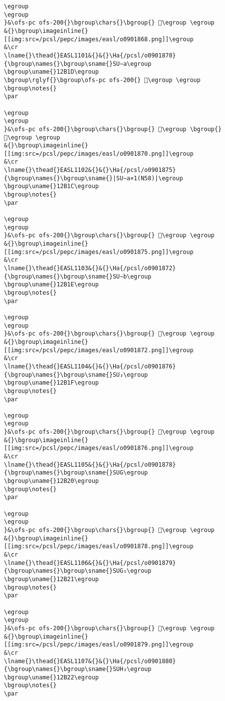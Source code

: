 \begin{verbatim}
\egroup
\egroup
}&\ofs-pc ofs-200{}\bgroup\chars{}\bgroup{} 𒬚\egroup \egroup
&{}\bgroup\imageinline{}[[img:src=/pcsl/pepc/images/easl/o0901868.png]]\egroup
&\cr
\lname{}\thead{}EASL1101&{}&{}\Ha{/pcsl/o0901870}{\bgroup\names{}\bgroup\sname{}SU∼a\egroup
\bgroup\uname{}12B1D\egroup
\bgroup\rglyf{}\bgroup\ofs-pc ofs-200{} 𒬝\egroup \egroup
\bgroup\notes{}
\par 

\egroup
\egroup
}&\ofs-pc ofs-200{}\bgroup\chars{}\bgroup{} 𒬛\egroup \bgroup{} 𒬝\egroup \egroup
&{}\bgroup\imageinline{}[[img:src=/pcsl/pepc/images/easl/o0901870.png]]\egroup
&\cr
\lname{}\thead{}EASL1102&{}&{}\Ha{/pcsl/o0901875}{\bgroup\names{}\bgroup\sname{}|SU∼a×1(N58)|\egroup
\bgroup\uname{}12B1C\egroup
\bgroup\notes{}
\par 

\egroup
\egroup
}&\ofs-pc ofs-200{}\bgroup\chars{}\bgroup{} 𒬜\egroup \egroup
&{}\bgroup\imageinline{}[[img:src=/pcsl/pepc/images/easl/o0901875.png]]\egroup
&\cr
\lname{}\thead{}EASL1103&{}&{}\Ha{/pcsl/o0901872}{\bgroup\names{}\bgroup\sname{}SU∼b\egroup
\bgroup\uname{}12B1E\egroup
\bgroup\notes{}
\par 

\egroup
\egroup
}&\ofs-pc ofs-200{}\bgroup\chars{}\bgroup{} 𒬞\egroup \egroup
&{}\bgroup\imageinline{}[[img:src=/pcsl/pepc/images/easl/o0901872.png]]\egroup
&\cr
\lname{}\thead{}EASL1104&{}&{}\Ha{/pcsl/o0901876}{\bgroup\names{}\bgroup\sname{}SU₃\egroup
\bgroup\uname{}12B1F\egroup
\bgroup\notes{}
\par 

\egroup
\egroup
}&\ofs-pc ofs-200{}\bgroup\chars{}\bgroup{} 𒬟\egroup \egroup
&{}\bgroup\imageinline{}[[img:src=/pcsl/pepc/images/easl/o0901876.png]]\egroup
&\cr
\lname{}\thead{}EASL1105&{}&{}\Ha{/pcsl/o0901878}{\bgroup\names{}\bgroup\sname{}SUG\egroup
\bgroup\uname{}12B20\egroup
\bgroup\notes{}
\par 

\egroup
\egroup
}&\ofs-pc ofs-200{}\bgroup\chars{}\bgroup{} 𒬠\egroup \egroup
&{}\bgroup\imageinline{}[[img:src=/pcsl/pepc/images/easl/o0901878.png]]\egroup
&\cr
\lname{}\thead{}EASL1106&{}&{}\Ha{/pcsl/o0901879}{\bgroup\names{}\bgroup\sname{}SUG₅\egroup
\bgroup\uname{}12B21\egroup
\bgroup\notes{}
\par 

\egroup
\egroup
}&\ofs-pc ofs-200{}\bgroup\chars{}\bgroup{} 𒬡\egroup \egroup
&{}\bgroup\imageinline{}[[img:src=/pcsl/pepc/images/easl/o0901879.png]]\egroup
&\cr
\lname{}\thead{}EASL1107&{}&{}\Ha{/pcsl/o0901880}{\bgroup\names{}\bgroup\sname{}SUH₃\egroup
\bgroup\uname{}12B22\egroup
\bgroup\notes{}
\par 


\end{verbatim}
